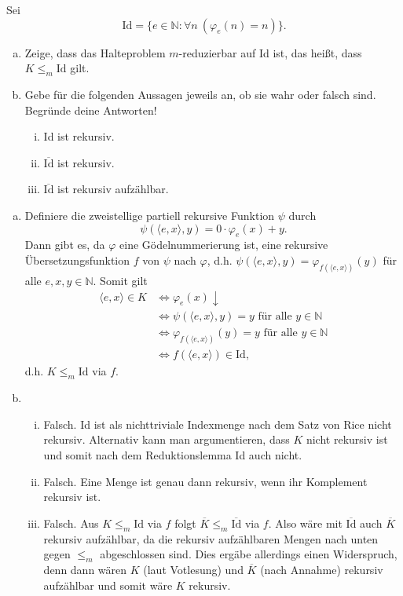 \documentclass[german,headsepline]{scrartcl}
\begin{document}
	\begin{question}[subtitle={Klausur 2012}]
		Sei
		\[\text{Id}=\{e\in\mathbb{N}\colon\forall n~(\varphi_e(n)=n)\}.\]
		\begin{enumerate}[(a)]
			\item Zeige, dass das Halteproblem $m$-reduzierbar auf Id ist, das heißt, dass $K\leq_m\text{Id}$ gilt.
			\item Gebe für die folgenden Aussagen jeweils an, ob sie wahr oder falsch sind.
				Begründe deine Antworten!
				\begin{enumerate}[(i)]
					\item Id ist rekursiv.
					\item $\overline{\text{Id}}$ ist rekursiv.
					\item $\overline{\text{Id}}$ ist rekursiv aufzählbar.
				\end{enumerate}
		\end{enumerate}
	\end{question}
	\begin{solution}
		\begin{enumerate}[(a)]
			\item Definiere die zweistellige partiell rekursive Funktion $\psi$ durch
				\[\psi(\langle e,x\rangle,y)=0\cdot\varphi_e(x)+y.\]
				Dann gibt es, da $\varphi$ eine Gödelnummerierung ist,
				eine rekursive Übersetzungsfunktion $f$ von $\psi$ nach $\varphi$,
				d.h. $\psi(\langle e,x\rangle,y)=\varphi_{f(\langle e,x\rangle)}(y)$ für alle $e,x,y\in\mathbb{N}$.
				Somit gilt
				\begin{align*}
					\langle e,x\rangle\in K &\Leftrightarrow \varphi_e(x)\downarrow \\
					&\Leftrightarrow \psi(\langle e,x\rangle,y)=y\text{ für alle }y\in\mathbb{N} \\
					&\Leftrightarrow \varphi_{f(\langle e,x\rangle)}(y)=y\text{ für alle }y\in\mathbb{N} \\
					&\Leftrightarrow f(\langle e,x\rangle)\in\text{Id},
				\end{align*}
				d.h. $K\leq_m\text{Id}$ via $f$.
			\item \begin{enumerate}[(i)]
				\item Falsch. Id ist als nichttriviale Indexmenge nach dem Satz von Rice nicht rekursiv.
					Alternativ kann man argumentieren, dass $K$ nicht rekursiv ist und somit nach dem Reduktionslemma Id auch nicht.
				\item Falsch. Eine Menge ist genau dann rekursiv, wenn ihr Komplement rekursiv ist.
				\item Falsch. Aus $K\leq_m\text{Id}$ via $f$ folgt $\overline{K}\leq_m\overline{\text{Id}}$ via $f$.
					Also wäre mit $\overline{\text{Id}}$ auch $\overline{K}$ rekursiv aufzählbar,
					da die rekursiv aufzählbaren Mengen nach unten gegen $\leq_m$ abgeschlossen sind.
					Dies ergäbe allerdings einen Widerspruch,
					denn dann wären $K$ (laut Votlesung) und $\overline{K}$ (nach Annahme) rekursiv aufzählbar und somit wäre $K$ rekursiv.
			\end{enumerate}
		\end{enumerate}
	\end{solution}
	
\end{document}
